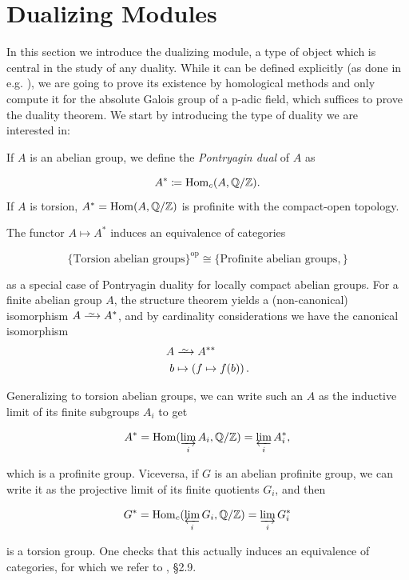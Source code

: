 \documentclass[a4paper, oneside]{memoir}
\begin{document}
\section{Dualizing Modules}

In this section we introduce the dualizing module, a type of object which is central in the study of any duality. While it can be defined explicitly (as done in e.g. \cite{Neukirch}),
we are going to prove its existence by homological methods and only compute it for the absolute Galois group of a p-adic field, which suffices to prove the duality theorem. We
start by introducing the type of duality we are interested in:

\begin{definition}
    If \(A\) is an abelian group, we define the \textit{Pontryagin dual} of \(A\) as

    \[
        A^*\coloneqq \operatorname{Hom}_{c}(A,\mathbb{Q}/\mathbb{Z})
        .\]
    If \(A\) is torsion, \(A^*=\operatorname{Hom}(A,\mathbb{Q}/\mathbb{Z})\) is profinite with the compact-open topology.
\end{definition}

\begin{remark}\label{rm:Pontryagin}
    The functor \(A\mapsto A^*\)  induces an equivalence of categories

    \[
        \{ \text{Torsion abelian groups} \}^{\text{op}}  \cong \{ \text{Profinite abelian groups}, \}
    \]

    as a special case of Pontryagin duality for locally compact abelian groups.
    For a finite abelian group \(A\), the structure theorem yields a (non-canonical) isomorphism \(A\Iso A^*\), and by cardinality considerations we have the canonical isomorphism
    \begin{align*}
        A & \Iso A^{**}                           \\
        b & \mapsto \left( f\mapsto f(b) \right).
    \end{align*}

    Generalizing to torsion abelian groups, we can write such an \(A\) as the inductive limit of its finite subgroups \(A_i\) to get

    \[
        A^* = \operatorname{Hom}(\varinjlim_i A_i,\mathbb{Q}/\mathbb{Z}) = \varprojlim_i A_i^*,
    \]

    which is a profinite group. Viceversa, if \(G\) is an abelian profinite group, we can write it as the projective limit of its finite quotients \(G_i\), and then

    \[
        G^* = \operatorname{Hom}_{c}( \varprojlim_i G_i,\mathbb{Q}/\mathbb{Z} ) = \varinjlim_i G_i^*
    \]

    is a torsion group. One checks that this actually induces an equivalence of categories, for which we refer to \cite{RibesZalesskii}, \S 2.9.
\end{remark}
\end{document}
